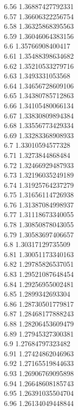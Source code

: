 {6.56	1.36887427792331\\
6.57	1.36606322256754\\
6.58	1.36325868395563\\
6.59	1.36046064383156\\
6.6	1.35766908400417\\
6.61	1.35488398634682\\
6.62	1.35210533279716\\
6.63	1.3493331053568\\
6.64	1.34656728609106\\
6.65	1.34380785712863\\
6.66	1.34105480066134\\
6.67	1.33830809894384\\
6.68	1.33556773429334\\
6.69	1.33283368908933\\
6.7	1.33010594577328\\
6.71	1.3273844868484\\
6.72	1.32466929487933\\
6.73	1.32196035249189\\
6.74	1.31925764237279\\
6.75	1.31656114726938\\
6.76	1.31387084998937\\
6.77	1.31118673340055\\
6.78	1.30850878043055\\
6.79	1.30583697406657\\
6.8	1.30317129735509\\
6.81	1.30051173340163\\
6.82	1.29785826537051\\
6.83	1.29521087648454\\
6.84	1.29256955002481\\
6.85	1.2899342693304\\
6.86	1.28730501779817\\
6.87	1.28468177888243\\
6.88	1.28206453609479\\
6.89	1.27945327300381\\
6.9	1.27684797323482\\
6.91	1.27424862046963\\
6.92	1.27165519844633\\
6.93	1.26906769095898\\
6.94	1.26648608185743\\
6.95	1.26391035504704\\
6.96	1.26134049448844\\
}

